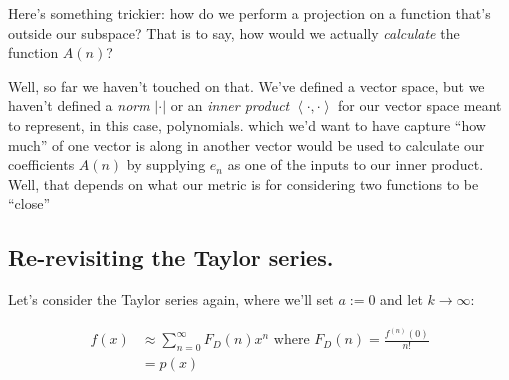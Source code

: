\documentclass[letterpaper,12pt]{report}
\begin{document}
Here's something trickier: how do we perform a projection on a function that's 
outside our subspace? That is to say, how would we actually \emph{calculate} the
function \(A(n)\)?\par
Well, so far we haven't touched on that. We've defined a vector space, but we
haven't defined a \emph{norm} \(|\cdot|\) or
an
\emph{inner product} \(\left<\cdot, \cdot\right>\) for our vector space meant to represent,
in this case, polynomials.
which 
we'd want to have capture ``how much'' of one vector is along in another vector would
be used to calculate our coefficients \(A(n)\) by supplying \(e_n\) as one of the
inputs to our inner product.
Well, that depends on what our metric is for considering two
functions to be ``close''




\subsection{Re-revisiting the Taylor series.}

Let's consider the Taylor series again,
where we'll set \(a:=0\) and let \(k \rightarrow \infty\):

\begin{equation}
  \begin{split}
    f(x) &\approx \sum_{n=0}^{\infty}F_D(n) x^n \text{ where } F_D(n) = \frac{f^{(n)}(0)}{n!} \\
         &= p(x)
  \end{split}
\end{equation}
\end{document}
